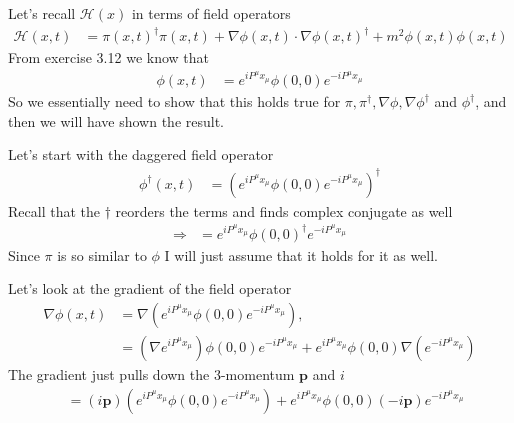 \documentclass[working, oneside]{../../Preambles/tuftebook}
\begin{document}
\begin{solution}
Let's recall \( \mathcal{H}(x) \) in terms of field operators
\begin{align*}
\mathcal{H}(x, t)
&= \pi(x, t)^\dagger \pi(x, t) + \nabla \phi(x, t) \cdot \nabla \phi(x, t)^\dagger + m^2 \phi(x, t) \phi(x, t)
\end{align*}
From exercise 3.12 we know that
\begin{align*}
\phi(x, t)
&= e^{i P^\mu x_\mu} \phi(0, 0) e^{-i P^\mu x_\mu}
\end{align*}
So we essentially need to show that this holds true for \( \pi, \pi^\dagger, \nabla \phi, \nabla \phi^\dagger \) and \( \phi^\dagger \), and then we will have shown the result.

Let's start with the daggered field operator
\begin{align*}
\phi^\dagger(x, t)
&= \left( e^{i P^\mu x_\mu} \phi(0, 0) e^{-i P^\mu x_\mu} \right)^\dagger
\end{align*}
Recall that the \( \dagger \) reorders the terms and finds complex conjugate as well
\begin{align*}
\Rightarrow
&= e^{i P^\mu x_\mu} \phi(0, 0)^\dagger e^{-i P^\mu x_\mu}
\end{align*}
Since \( \pi \) is so similar to \( \phi \) I will just assume that it holds for it as well.

Let's look at the gradient of the field operator
\begin{align*}
\nabla \phi(x, t)
&= \nabla \left( e^{i P^\mu x_\mu} \phi(0, 0) e^{-i P^\mu x_\mu} \right), \\
&= \left( \nabla e^{i P^\mu x_\mu} \right) \phi(0, 0) e^{-i P^\mu x_\mu} + e^{i P^\mu x_\mu} \phi(0, 0) \nabla \left( e^{-i P^\mu x_\mu} \right)
\end{align*}
The gradient just pulls down the 3-momentum \( \mathbf{p} \) and \( i \)
\begin{align*}
&= (i \mathbf{p}) \left( e^{i P^\mu x_\mu} \phi(0, 0) e^{-i P^\mu x_\mu} \right) + e^{i P^\mu x_\mu} \phi(0, 0) (-i \mathbf{p}) e^{-i P^\mu x_\mu}
\end{align*}


\end{solution}
\end{document}
